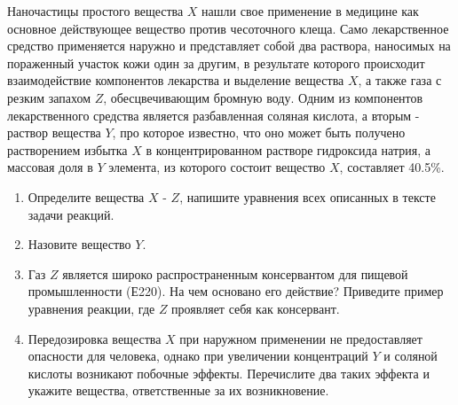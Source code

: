 
Наночастицы простого вещества $X$ нашли свое применение в медицине как основное действующее вещество против 
чесоточного клеща. Само лекарственное средство применяется наружно и представляет собой два раствора, наносимых 
на пораженный участок кожи один за другим, в результате которого происходит взаимодействие компонентов лекарства 
и выделение вещества $X$, а также газа с резким запахом $Z$, обесцвечивающим бромную воду. Одним из компонентов 
лекарственного средства является разбавленная соляная кислота, а вторым - раствор вещества $Y$, про которое 
известно, что оно может быть получено растворением избытка $X$ в концентрированном растворе гидроксида натрия,  
а массовая доля в $Y$ элемента, из которого состоит вещество $X$, составляет 40.5\%.

\begin{enumerate}
    \item Определите вещества $X$ - $Z$, напишите уравнения всех описанных в тексте задачи реакций.
    \item Назовите вещество $Y$.
    \item Газ $Z$ является широко распространенным консервантом для пищевой промышленности (Е220). На чем основано его действие? 
    Приведите пример уравнения реакции, где $Z$ проявляет себя как консервант.    
    \item Передозировка вещества $X$ при наружном применении не предоставляет опасности для человека, 
    однако при увеличении концентраций $Y$ и соляной кислоты возникают побочные эффекты. Перечислите два 
    таких эффекта и укажите вещества, ответственные за их возникновение. 
\end{enumerate}

